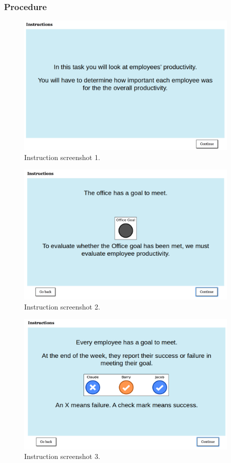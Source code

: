 \documentclass[11pt]{article}
\begin{document}
\subsubsection{Procedure}
\label{ssub:procedure}

\begin{figure}[H]
	\centering
	\includegraphics[width=0.95\textwidth]{screenshot_1}
	\caption{Instruction screenshot 1.}
	\label{fig:screenshot_1}
\end{figure}
\begin{figure}[H]
	\centering
	\includegraphics[width=0.95\textwidth]{screenshot_2}
	\caption{Instruction screenshot 2.}
	\label{fig:screenshot_2}
\end{figure}
\begin{figure}[H]
	\centering
	\includegraphics[width=0.95\textwidth]{screenshot_3}
	\caption{Instruction screenshot 3.}
	\label{fig:screenshot_3}
\end{figure}
\end{document}
